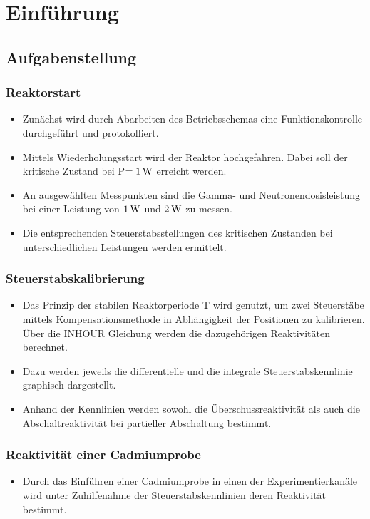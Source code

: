 \section{Einführung}
	\subsection{Aufgabenstellung}
	
	\subsubsection{Reaktorstart}
	\begin{itemize}
	\item Zunächst wird durch Abarbeiten des Betriebsschemas eine Funktionskontrolle durchgeführt und protokolliert.
	\item Mittels Wiederholungsstart wird der Reaktor hochgefahren. Dabei soll der kritische Zustand bei P$=\unit[1]{W}$ erreicht werden.
	\item An ausgewählten Messpunkten sind die Gamma- und Neutronendosisleistung bei einer Leistung von $\unit[1]{W}$ und $\unit[2]{W}$ zu messen.
	\item Die entsprechenden Steuerstabsstellungen des kritischen Zustanden bei unterschiedlichen Leistungen werden ermittelt. 
	\end{itemize}
	
	\subsubsection{Steuerstabskalibrierung}
	\begin{itemize}
	\item Das Prinzip der stabilen Reaktorperiode T wird genutzt, um zwei Steuerstäbe mittels Kompensationsmethode in Abhängigkeit der Positionen zu kalibrieren. Über die INHOUR Gleichung werden die dazugehörigen Reaktivitäten berechnet.
	\item Dazu werden jeweils die differentielle und die integrale Steuerstabskennlinie graphisch dargestellt.
	\item Anhand der Kennlinien werden sowohl die Überschussreaktivität als auch die Abschaltreaktivität bei partieller Abschaltung bestimmt.
	\end{itemize}
	
	\subsubsection{Reaktivität einer Cadmiumprobe}
	\begin{itemize}
	\item Durch das Einführen einer Cadmiumprobe in einen der Experimentierkanäle wird unter Zuhilfenahme der Steuerstabskennlinien deren Reaktivität bestimmt.
	\end{itemize}
	
